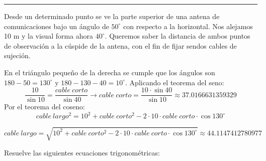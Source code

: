 \documentclass[addpoints,spanish, 12pt,a4paper]{exam}
\begin{document}
\noindent
\rule[2ex]{\textwidth}{2pt}
\begin{questions}
    \question[2] Desde un determinado punto se ve la parte superior de una antena de comunicaciones bajo un ángulo de $50^\circ$ con respecto a la horizontal. Nos alejamos 10 m y la visual forma ahora $40^\circ$. Queremos saber la distancia de ambos puntos de observación a la cúspide de la antena, con el fin de fijar sendos cables de sujeción.
\begin{solution}

    En el triángulo pequeño de la derecha se cumple que los ángulos son $180-50=130^\circ$ y $180-130-40=10^\circ$. Aplicando el teorema del seno:
    $$\dfrac{10}{\sin{10}}=\dfrac{cable\ corto}{\sin{40}} \to cable\ corto=\dfrac{10\cdot\sin{40}}{\sin{10}}\approx 37.0166631359329
    $$
    Por el teorema del coseno:
    $$cable\ largo^2=10^2 + cable\ corto^2 - 2\cdot 10\cdot cable \ corto \cdot \cos{130^\circ}$$
    
    $$cable \ largo =\sqrt{10^2 + cable\ corto^2 - 2\cdot 10\cdot cable \ corto \cdot \cos{130^\circ}}\approx 44.1147412780977$$

\end{solution}

\question Resuelve las siguientes ecuaciones trigonométricas:
\begin{parts}

\end{parts}
\end{questions}
\end{document}

